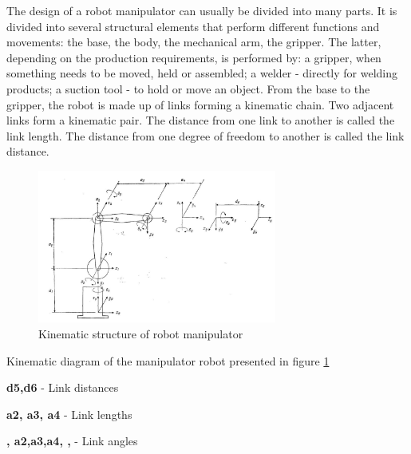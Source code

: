 The design of a robot manipulator can usually be divided into many parts.
It is divided into several structural elements that perform different functions and movements: the base, the body, the mechanical arm, the gripper. The latter, depending on the production requirements, is performed by: a gripper, when something needs to be moved, held or assembled; a welder - directly for welding products; a suction tool - to hold or move an object. From the base to the gripper, the robot is made up of links forming a kinematic chain. Two adjacent links form a kinematic pair. The distance from one link to another is called the link length. The distance from one degree of freedom to another is called the link distance. 


\begin{figure}[H]
	\centering
	\includegraphics[width=0.7\textwidth]{Src/images/KinStr.png}
	\caption{Kinematic structure of robot manipulator}
    \label{kinematic1}
\end{figure}

Kinematic diagram of the manipulator robot presented in figure \ref*{kinematic1} 

\textbf{d5,d6} - Link distances 

\textbf{a2, a3, a4} - Link lengths 

\textbf{ , \phi a2,\phi  a3,\phi a4,  ,} - Link angles